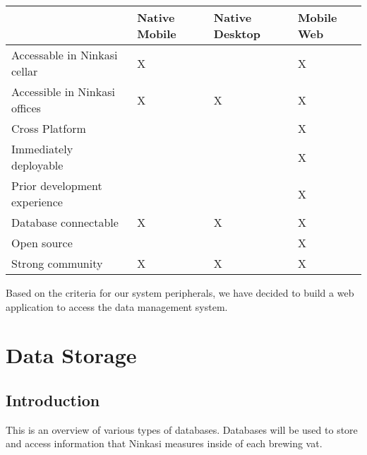 \documentclass[draftclsnofoot,onecolumn,letterpaper,10pt,compsoc]{IEEEtran}
\begin{document}
        
        \begin{center}
            \begin{tabular}{ |m{14em}|m{9em}|m{9em}|m{9em}|}
                \hline
                    & Native Mobile & Native Desktop & Mobile Web \\
                
                \hline
                    Accessable in Ninkasi cellar & X & & X \\
                    
                \hline
                    Accessible in Ninkasi offices & X & X & X \\
        
                \hline
                    Cross Platform &  &  & X \\
                    
                \hline
                    Immediately deployable &  &  & X \\
                    
                \hline
                    Prior development experience &  &  & X \\
                    
                \hline
                     Database connectable & X & X & X \\
                     
                \hline
                    Open source & & & X \\
                
                \hline
                    Strong community & X & X & X \\
                
                \hline
        
            \end{tabular}
        \end{center}
    
    Based on the criteria for our system peripherals, we have decided to build a web application to access the data management system.

\section{Data Storage}
    \subsection{Introduction}
    This is an overview of various types of databases. Databases will be used to store and access information that Ninkasi measures inside of each brewing vat.
    
\end{document}

